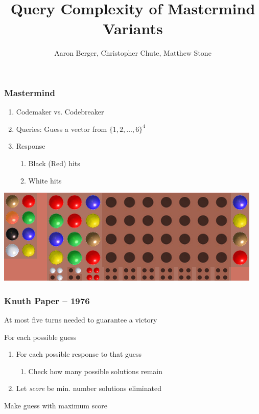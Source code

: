 \documentclass{beamer}
\title{Query Complexity of Mastermind Variants}
\author{Aaron Berger, Christopher Chute, Matthew Stone}
\begin{document}
    \begin{frame}
    	\maketitle
    \end{frame}

    \begin{frame}
    	\frametitle{Mastermind}
	   	\begin{enumerate}[label=\roman*.]
	    \item Codemaker vs. Codebreaker
	    \item Queries: Guess a vector from $\{1,2,\ldots,6\}^4$
	    \item Response
	    	\begin{enumerate}[label=\roman*.]
			\item Black (Red) hits
			\item White hits
			\end{enumerate}
   	    \end{enumerate}
	    \begin{center}
	    \includegraphics[width=.65\textwidth, keepaspectratio=true]{mm.png}
	    \end{center}
    \end{frame}

    \begin{frame}
    	\frametitle{Knuth Paper -- 1976}
		At most five turns needed to guarantee a victory\vspace{\baselineskip}
		\begin{tcolorbox}[colback=green!5,colframe=green!40!black,title=Minimax]
		For each possible guess
			\begin{enumerate}[label=]
			\item For each possible response to that guess
				\begin{enumerate}[label=]
				\item Check how many possible solutions remain
				\end{enumerate}
			\item Let \textit{score} be min. number solutions eliminated
			\end{enumerate}
		Make guess with maximum score
		\end{tcolorbox}
    \end{frame}
 
\end{document}
